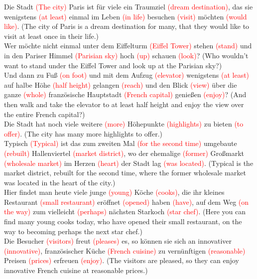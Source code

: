 \documentclass{article}
\begin{document}
\begin{enumerate}
    Die Stadt \textcolor{red}{(The city)} Paris ist für viele ein Traumziel \textcolor{red}{(dream destination)}, das sie wenigstens \textcolor{red}{(at least)} einmal im Leben \textcolor{red}{(in life)} besuchen \textcolor{red}{(visit)} möchten \textcolor{red}{(would like)}. (The city of Paris is a dream destination for many, that they would like to visit at least once in their life.) \\
    Wer möchte nicht einmal unter dem Eiffelturm \textcolor{red}{(Eiffel Tower)} stehen \textcolor{red}{(stand)} und in den Pariser Himmel \textcolor{red}{(Parisian sky)} hoch \textcolor{red}{(up)} schauen \textcolor{red}{(look)}? (Who wouldn't want to stand under the Eiffel Tower and look up at the Parisian sky?) \\
    Und dann zu Fuß \textcolor{red}{(on foot)} und mit dem Aufzug \textcolor{red}{(elevator)} wenigstens \textcolor{red}{(at least)} auf halbe Höhe \textcolor{red}{(half height)} gelangen \textcolor{red}{(reach)} und den Blick \textcolor{red}{(view)} über die ganze \textcolor{red}{(whole)} französische Hauptstadt \textcolor{red}{(French capital)} genießen \textcolor{red}{(enjoy)}? (And then walk and take the elevator to at least half height and enjoy the view over the entire French capital?) \\
    Die Stadt hat noch viele weitere \textcolor{red}{(more)} Höhepunkte \textcolor{red}{(highlights)} zu bieten \textcolor{red}{(to offer)}. (The city has many more highlights to offer.) \\
    Typisch \textcolor{red}{(Typical)} ist das zum zweiten Mal \textcolor{red}{(for the second time)} umgebaute \textcolor{red}{(rebuilt)} Hallenviertel \textcolor{red}{(market district)}, wo der ehemalige \textcolor{red}{(former)} Großmarkt \textcolor{red}{(wholesale market)} im Herzen \textcolor{red}{(heart)} der Stadt lag \textcolor{red}{(was located)}. (Typical is the market district, rebuilt for the second time, where the former wholesale market was located in the heart of the city.) \\
    Hier findet man heute viele junge \textcolor{red}{(young)} Köche \textcolor{red}{(cooks)}, die ihr kleines Restaurant \textcolor{red}{(small restaurant)} eröffnet \textcolor{red}{(opened)} haben \textcolor{red}{(have)}, auf dem Weg \textcolor{red}{(on the way)} zum vielleicht \textcolor{red}{(perhaps)} nächsten Starkoch \textcolor{red}{(star chef)}. (Here you can find many young cooks today, who have opened their small restaurant, on the way to becoming perhaps the next star chef.) \\
    Die Besucher \textcolor{red}{(visitors)} freut \textcolor{red}{(pleases)} es, so können sie sich an innovativer \textcolor{red}{(innovative)}, französischer Küche \textcolor{red}{(French cuisine)} zu vernünftigen \textcolor{red}{(reasonable)} Preisen \textcolor{red}{(prices)} erfreuen \textcolor{red}{(enjoy)}. (The visitors are pleased, so they can enjoy innovative French cuisine at reasonable prices.)


\end{enumerate}
\end{document}
